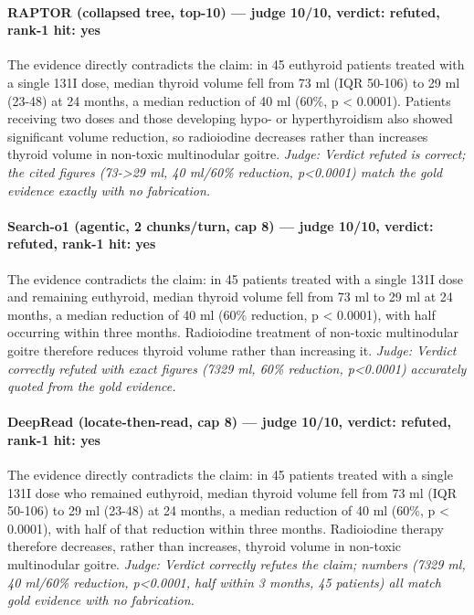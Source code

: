 \documentclass[sigconf, review, anonymous]{acmart}
\begin{document}
\paragraph{RAPTOR (collapsed tree, top-10) --- judge 10/10, verdict: refuted, rank-1 hit: yes}
\noindent The evidence directly contradicts the claim: in 45 euthyroid patients treated with a single 131I dose, median thyroid volume fell from 73 ml (IQR 50-106) to 29 ml (23-48) at 24 months, a median reduction of 40 ml (60\%, p < 0.0001). Patients receiving two doses and those developing hypo- or hyperthyroidism also showed significant volume reduction, so radioiodine decreases rather than increases thyroid volume in non-toxic multinodular goitre.
\noindent\small\textit{Judge: Verdict refuted is correct; the cited figures (73->29 ml, 40 ml/60\% reduction, p<0.0001) match the gold evidence exactly with no fabrication.}
\paragraph{Search-o1 (agentic, 2 chunks/turn, cap 8) --- judge 10/10, verdict: refuted, rank-1 hit: yes}
\noindent The evidence contradicts the claim: in 45 patients treated with a single 131I dose and remaining euthyroid, median thyroid volume fell from 73 ml to 29 ml at 24 months, a median reduction of 40 ml (60\% reduction, p < 0.0001), with half occurring within three months. Radioiodine treatment of non-toxic multinodular goitre therefore reduces thyroid volume rather than increasing it.
\noindent\small\textit{Judge: Verdict correctly refuted with exact figures (7329 ml, 60\% reduction, p<0.0001) accurately quoted from the gold evidence.}
\paragraph{DeepRead (locate-then-read, cap 8) --- judge 10/10, verdict: refuted, rank-1 hit: yes}
\noindent The evidence directly contradicts the claim: in 45 patients treated with a single 131I dose who remained euthyroid, median thyroid volume fell from 73 ml (IQR 50-106) to 29 ml (23-48) at 24 months, a median reduction of 40 ml (60\%, p < 0.0001), with half of that reduction within three months. Radioiodine therapy therefore decreases, rather than increases, thyroid volume in non-toxic multinodular goitre.
\noindent\small\textit{Judge: Verdict correctly refutes the claim; numbers (7329 ml, 40 ml/60\% reduction, p<0.0001, half within 3 months, 45 patients) all match gold evidence with no fabrication.}
\end{document}
